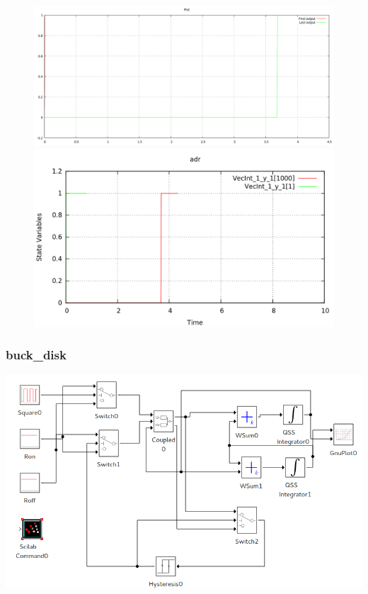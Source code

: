 \documentclass[a4paper,	11pt]{report}
\begin{document}
\begin{figure}[H]
\centering
\begin{minipage}{0.5\textwidth}
\centering
 \includegraphics[width=\linewidth]{adr-pd}
\end{minipage}\hfill
\begin{minipage}{0.5\textwidth}
\centering
 \includegraphics[width=\linewidth]{adr-qss}
\end{minipage}
\end{figure}

\subsubsection{buck\_disk}

 \includegraphics[width=0.75\linewidth]{buck_disk}
\end{document}
